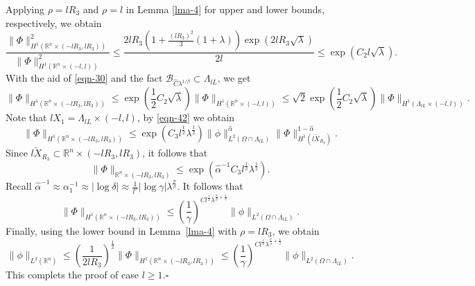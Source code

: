 \documentclass[12pt]{amsart}
\newcommand\R{\ensuremath{\mathbb{R}}}
\theoremstyle{definition}
\begin{document}
Applying $\rho =lR_3$ and $\rho =l$ in Lemma \ref{lma-4} for upper and lower bounds, respectively, we obtain
\begin{equation}
	\frac{\|\Phi\|^2_{H^{1}\left( \R^{n}\times (-lR_3,lR_3) \right) }}{\|\Phi\|^2_{H^{1}\left( \R^{n}\times (-l,l) \right) }}\le \frac{2l R_3 \left( 1+ \frac{(lR_3)^2}{3}(1+\lambda) \right) \exp(2lR_3\sqrt{\lambda} )}{2l}\le \exp\left(C_2 l \sqrt{\lambda}   \right).  
\end{equation}
With the aid of \eqref{eqn-30} and the fact $\mathcal{B}_{\widehat{C}\lambda ^{1 /\beta }}\subset \Lambda_{lL}$, we get
\begin{equation}
	\|\Phi\|_{H^{1}\left( \R^{n}\times (-lR_3,lR_3) \right) }\le \exp\left( \frac{1}{2}C_2 \sqrt{\lambda}  \right) \|\Phi\|_{H^{1}\left( \R^{n}\times (-l,l) \right) }\le \sqrt{2}  \exp \left( \frac{1}{2}C_2 \sqrt{\lambda}  \right) \|\Phi\|_{H^{1}\left( \Lambda_{lL}\times (-l,l) \right) }.
\end{equation}
Note that $lX_1=\Lambda_{lL}\times (-l,l)$, by \eqref{eqn-42} we obtain
\begin{equation}	
	\|\Phi\|_{H^{1}(\R^{n}\times (-lR_3,lR_3))}\le \exp\left( C_3 l^{\frac{1}{2}}\lambda^{\frac{1}{2}} \right) \|\phi\|^{\widehat{\alpha }}_{L^2\left( \Omega \cap \Lambda_{lL} \right) }\|\Phi\|^{1-\widehat{\alpha }}_{H^{1}\left( l \widetilde{X}_{R_3} \right) }.
\end{equation}
Since $l \widetilde{X}_{R_3}\subset \R^{n}\times \left( -l R_3,lR_3 \right) $, it follows that
\begin{equation}
	\|\Phi\|_{\R^{n}\times (-lR_3,lR_3)}\le \exp \left( \widehat{\alpha }^{-1}C_3 l^{\frac{1}{2}}\lambda^{\frac{1}{2}} \right). 
\end{equation}
Recall $\widehat{\alpha }^{-1}\approx \alpha ^{-1}_1\approx |\log \delta |\approx \frac{1}{l^{\sigma }}|\log \gamma|\lambda ^{\frac{\sigma }{\beta }}$. It follows that
\begin{equation}
	\|\Phi\|_{H^{1}\left( \R^{n}\times (-lR_3,lR_3) \right) }\le \left( \frac{1}{\gamma} \right) ^{C l^{\frac{1}{2}}\lambda^{\frac{\sigma }{\beta }+\frac{1}{2}}}\|\phi\|_{L^2\left( \Omega \cap \Lambda_{lL} \right) }.
\end{equation}
Finally, using the lower bound in Lemma~\ref{lma-4} with $\rho =lR_3$, we obtain
\begin{equation}
	\|\phi\|_{L^2\left( \R^{n} \right) }\le \left( \frac{1}{2lR_3} \right) ^{\frac{1}{2}}\|\Phi\|_{H^{1}\left( \R^{n}\times (-lR_3,lR_3) \right) }\le \left( \frac{1}{\gamma} \right) ^{C l^{\frac{1}{2}}\lambda^{\frac{\sigma }{\beta }+\frac{1}{2}}}\|\phi\|_{L^2\left( \Omega \cap \Lambda_{lL} \right) }.
\end{equation}
This complets the proof of case $l\ge 1$.\hfill  $\square$
\end{document}
